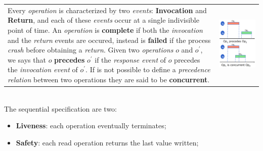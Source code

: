 \documentclass{article}
\begin{document}
\begin{tabular}{C{10.5cm}  L{10.5cm}}
Every \emph{operation} is characterized by two \emph{events}: \textbf{Invocation} and \textbf{Return}, and each of these \emph{events} occur at a single indivisible point of time. An \emph{operation} is \textbf{complete} if both the \emph{invocation} and the \emph{return} events are occured, instead is \textbf{failed} if the process \emph{crash} before obtaining a \emph{return}. Given two \emph{operations} $o$ and $o^{'}$, we says that $o$ \textbf{precedes} $o^{'}$ if the \emph{response event }of $o$ precedes the \emph{invocation event} of $o^{'}$. If is not possible to define a \emph{precedence relation} between two operations they are said to be \textbf{concurrent}. & \includegraphics[scale=0.5]{cattura62.png}
\end{tabular}\\
The sequential specification are two:
\begin{itemize}
\item \textbf{Liveness}: each operation eventually terminates;
\item \textbf{Safety}: each read operation returns the last value written;
\end{itemize}
\end{document}

